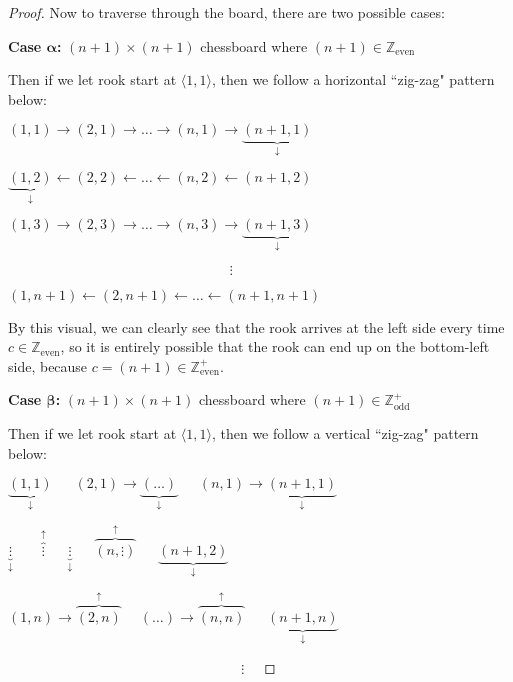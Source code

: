\documentclass[12pt]{article}
\begin{document}
\begin{enumerate}[label=Part \Alph*)]
\begin{proof}[Proof]
         Now to traverse through the board, there are two possible cases:
        
        \textbf{Case $\boldsymbol{\alpha}$:} $(n + 1) \times (n + 1)$ chessboard where $(n + 1) \in \mathbb{Z}_{\text{even}}$
        
        Then if we let rook start at $\langle 1, 1 \rangle $, then we follow a horizontal ``zig-zag" pattern below:
        
        $(1, 1) \rightarrow (2, 1) \rightarrow \ldots \rightarrow (n, 1) \rightarrow \underbrace{(n + 1, 1)}_{\downarrow}$
        
		$\underbrace{(1, 2)}_{\downarrow} \leftarrow (2, 2) \leftarrow \ldots \leftarrow  (n, 2) \leftarrow (n + 1, 2)$
		
		$(1, 3) \rightarrow (2, 3) \rightarrow \ldots \rightarrow  (n, 3) \rightarrow \underbrace{(n + 1, 3)}_{\downarrow}$
		
		$\hspace{190pt}\vdots\hspace{11pt}$
		
		$(1, n + 1) \leftarrow (2, n + 1) \leftarrow \ldots \leftarrow (n + 1, n + 1)$
		
		By this visual, we can clearly see that the rook arrives at the left side every time $c \in \mathbb{Z}_{\text{even}}$, so it is entirely possible that the rook can end up on the bottom-left side, because $c = (n + 1) \in \mathbb{Z}_{\text{even}}^{+}$.
 
        \textbf{Case $\boldsymbol{\beta}$:} $(n + 1) \times (n + 1)$ chessboard where $(n + 1) \in \mathbb{Z}_{\text{odd}}^{+}$
        
        Then if we let rook start at $\langle 1, 1 \rangle $, then we follow a vertical ``zig-zag" pattern below:
        
        $\underbrace{(1, 1)}_{\downarrow} \quad\;\; (2, 1) \rightarrow \underbrace{(\ldots)}_{\downarrow} \quad\;\; (n, 1) \rightarrow \underbrace{(n + 1, 1)}_{\downarrow}$
        
		$\underbrace{\vdots}_{\downarrow} \quad\quad \overbrace{\vdots}^{\uparrow} \quad\;\; \underbrace{\vdots}_{\downarrow} \quad\;\;  \overbrace{(n, \vdots )}^{\uparrow} \quad\;\; \underbrace{(n + 1, 2)}_{\downarrow}$
		
		$(1, n) \rightarrow \overbrace{(2, n)}^{\uparrow} \quad\; (\ldots) \rightarrow \overbrace{(n, n)}^{\uparrow} \quad\;\; \underbrace{(n + 1, n)}_{\downarrow}$
		
		$\hspace{200pt}\vdots\hspace{11pt}$
		

\end{proof}
\end{enumerate}
\end{document}
